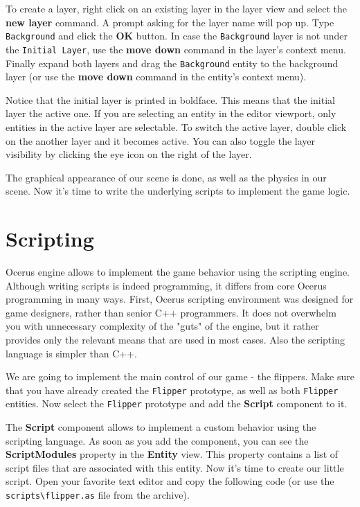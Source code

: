 \documentclass[a4paper,12pt]{article}
\begin{document}
To create a layer, right click on an existing layer in the layer view and select the \textbf{new layer} command. A prompt asking for the layer name will pop up. Type \texttt{Background} and click the \textbf{OK} button. In case the \texttt{Background} layer is not under the \texttt{Initial Layer}, use the \textbf{move down} command in the layer's context menu. Finally expand both layers and drag the \texttt{Background} entity to the background layer (or use the \textbf{move down} command in the entity's context menu).

Notice that the initial layer is printed in boldface. This means that the initial layer the active one. If you are selecting an entity in the editor viewport, only entities in the active layer are selectable. To switch the active layer, double click on the another layer and it becomes active. You can also toggle the layer visibility by clicking the eye icon on the right of the layer.

The graphical appearance of our scene is done, as well as the physics in our scene. Now it's time to write the underlying scripts to implement the game logic.

\section{Scripting}
Ocerus engine allows to implement the game behavior using the scripting engine. Although writing scripts is indeed programming, it differs from core Ocerus programming in many ways. First, Ocerus scripting environment was designed for game designers, rather than senior C++ programmers. It does not overwhelm you with unnecessary complexity of the "guts" of the engine, but it rather provides only the relevant means that are used in most cases. Also the scripting language is simpler than C++.

We are going to implement the main control of our game - the flippers. Make sure that you have already created the \texttt{Flipper} prototype, as well as both \texttt{Flipper} entities. Now select the \texttt{Flipper} prototype and add the \textbf{Script} component to it.

The \textbf{Script} component allows to implement a custom behavior using the scripting language. As soon as you add the component, you can see the \textbf{ScriptModules} property in the \textbf{Entity} view. This property contains a list of script files that are associated with this entity. Now it's time to create our little script. Open your favorite text editor and copy the following code (or use the \texttt{scripts\textbackslash flipper.as} file from the archive).
\end{document}
